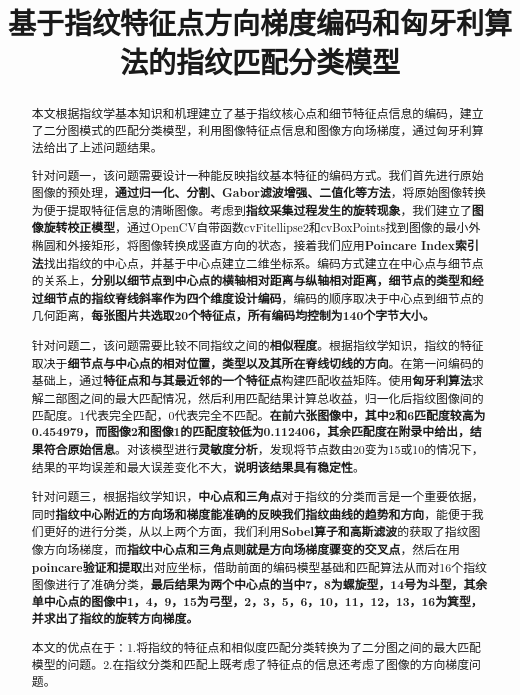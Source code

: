 \documentclass[withoutpreface,bwprint]{cumcmthesis} %
\title{基于指纹特征点方向梯度编码和匈牙利算法的指纹匹配分类模型}
\begin{document}
\maketitle
\begin{abstract}
	本文根据指纹学基本知识和机理建立了基于指纹核心点和细节特征点信息的编码，建立了二分图模式的匹配分类模型，利用图像特征点信息和图像方向场梯度，通过匈牙利算法给出了上述问题结果。
   
   针对问题一，该问题需要设计一种能反映指纹基本特征的编码方式。我们首先进行原始图像的预处理，\textbf{通过归一化、分割、Gabor滤波增强、二值化等方法}，将原始图像转换为便于提取特征信息的清晰图像。考虑到\textbf{指纹采集过程发生的旋转现象}，我们建立了\textbf{图像旋转校正模型}，通过OpenCV自带函数cvFitellipse2和cvBoxPoints找到图像的最小外椭圆和外接矩形，将图像转换成竖直方向的状态，接着我们应用\textbf{Poincare Index索引法}找出指纹的中心点，并基于中心点建立二维坐标系。编码方式建立在中心点与细节点的关系上，\textbf{分别以细节点到中心点的横轴相对距离与纵轴相对距离，细节点的类型和经过细节点的指纹脊线斜率作为四个维度设计编码}，编码的顺序取决于中心点到细节点的几何距离，\textbf{每张图片共选取20个特征点，所有编码均控制为140个字节大小。}
   
   针对问题二，该问题需要比较不同指纹之间的\textbf{相似程度}。根据指纹学知识，指纹的特征取决于\textbf{细节点与中心点的相对位置，类型以及其所在脊线切线的方向}。在第一问编码的基础上，通过\textbf{特征点和与其最近邻的一个特征点}构建匹配收益矩阵。使用\textbf{匈牙利算法}求解二部图之间的最大匹配情况，然后利用匹配结果计算总收益，归一化后指纹图像间的匹配度。1代表完全匹配，0代表完全不匹配。\textbf{在前六张图像中，其中2和6匹配度较高为0.454979，而图像2和图像1的匹配度较低为0.112406，其余匹配度在附录中给出，结果符合原始信息}。对该模型进行\textbf{灵敏度分析}，发现将节点数由20变为15或10的情况下，结果的平均误差和最大误差变化不大，\textbf{说明该结果具有稳定性}。
   
   针对问题三，根据指纹学知识，\textbf{中心点和三角点}对于指纹的分类而言是一个重要依据，同时\textbf{指纹中心附近的方向场和梯度能准确的反映我们指纹曲线的趋势和方向}，能便于我们更好的进行分类，从以上两个方面，我们利用\textbf{Sobel算子和高斯滤波}的获取了指纹图像方向场梯度，而\textbf{指纹中心点和三角点则就是方向场梯度骤变的交叉点}，然后在用\textbf{poincare验证和提取}出对应坐标，借助前面的编码模型基础和匹配算法从而对16个指纹图像进行了准确分类，\textbf{最后结果为两个中心点的当中7，8为螺旋型，14号为斗型，其余单中心点的图像中1，4，9，15为弓型，2，3，5，6，10，11，12，13，16为箕型，并求出了指纹的旋转方向梯度。}
   
   本文的优点在于：1.将指纹的特征点和相似度匹配分类转换为了二分图之间的最大匹配模型的问题。2.在指纹分类和匹配上既考虑了特征点的信息还考虑了图像的方向梯度问题。
   \end{abstract}
\end{document}
